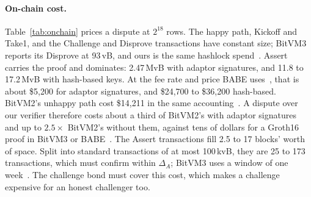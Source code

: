 \documentclass[11pt]{article}
\begin{document}
\paragraph{On-chain cost.} Table~\ref{tab:onchain} prices a dispute at $2^{18}$
rows. The happy path, Kickoff and Take1, and the Challenge and Disprove
transactions have constant size; BitVM3 reports its Disprove at 93\,vB, and ours
is the same hashlock spend~\cite{bitvm3paper}. Assert carries the proof and
dominates: 2.47\,MvB with adaptor signatures, and 11.8 to 17.2\,MvB with
hash-based keys. At the fee rate and price BABE uses~\cite{babe2026}, that is
about \$5{,}200 for adaptor signatures, and \$24{,}700 to \$36{,}200 hash-based. BitVM2's unhappy path cost \$14{,}211 in the same
accounting~\cite{babe2026}. A dispute over our verifier therefore costs about a
third of BitVM2's with adaptor signatures and up to $2.5\times$ BitVM2's without
them, against tens of dollars for a Groth16 proof in BitVM3 or
BABE~\cite{bitvm3paper,babe2026}. The Assert transactions fill 2.5 to 17 blocks'
worth of space. Split into standard transactions of at most 100\,kvB, they are 25
to 173 transactions, which must confirm within $\Delta_A$; BitVM3 uses a window
of one week~\cite{bitvm3paper}. The challenge bond must cover this cost, which
makes a challenge expensive for an honest challenger too.

\begin{table}[t]\centering\small
{}
\caption{Publishing the proof dominates a dispute: 2.5\,MvB with adaptor signatures
and 12 to 17\,MvB with hash-based keys at $2^{18}$ rows. Assert size, the number
of standard transactions (at most 100\,kvB each) and the fee, at 2.2\,sat/vB and
\$95{,}500 per bitcoin as in BABE~\cite{babe2026}. The Lamport rate is our measured
script and witness with per-input overhead; the other rates are as their sources
report them. The tuned column is the smallest input of
Table~\ref{tab:inputs}.}
\label{tab:onchain}
\end{table}
\end{document}
